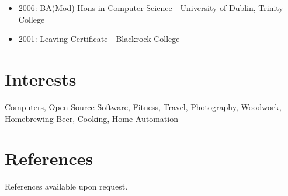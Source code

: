 \documentclass[a4paper, 10pt] {article}
\begin{document}
\begin{itemize}
  \item 2006: BA(Mod) Hons in Computer Science - University of Dublin, Trinity College
  \item 2001: Leaving Certificate - Blackrock College
\end{itemize}

\hrulefill

\section*{Interests}

Computers, Open Source Software, Fitness, Travel, Photography, Woodwork,
Homebrewing Beer, Cooking, Home Automation

\hrulefill

\section*{References}

References available upon request.
\end{document}
